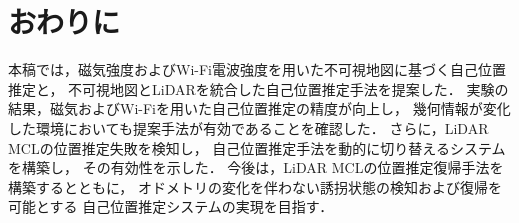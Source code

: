 \section{おわりに}
本稿では，磁気強度およびWi-Fi電波強度を用いた不可視地図に基づく自己位置推定と，
不可視地図とLiDARを統合した自己位置推定手法を提案した．
実験の結果，磁気およびWi-Fiを用いた自己位置推定の精度が向上し，
幾何情報が変化した環境においても提案手法が有効であることを確認した．
さらに，LiDAR MCLの位置推定失敗を検知し，
自己位置推定手法を動的に切り替えるシステムを構築し，
その有効性を示した．
今後は，LiDAR MCLの位置推定復帰手法を構築するとともに，
オドメトリの変化を伴わない誘拐状態の検知および復帰を可能とする
自己位置推定システムの実現を目指す．
